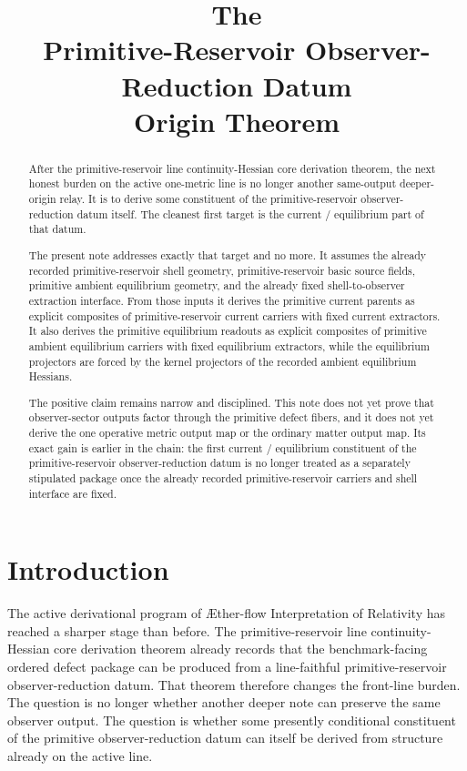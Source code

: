 \documentclass[11pt]{article}
\title{\textbf{The \TheoryName{}}\\[0.4em]
\large Primitive-Reservoir Observer-Reduction Datum\\
\large Origin Theorem}
\author{}
\date{}
\newcommand{\Aflow}{\AE{}ther-flow}
\newcommand{\TheoryName}{\Aflow{} Interpretation of Relativity}
\begin{document}
\maketitle

\begin{abstract}
After the primitive-reservoir line continuity-Hessian core derivation theorem, the next honest burden on the active one-metric line is no longer another same-output deeper-origin relay. It is to derive some constituent of the primitive-reservoir observer-reduction datum itself. The cleanest first target is the current / equilibrium part of that datum.

The present note addresses exactly that target and no more. It assumes the already recorded primitive-reservoir shell geometry, primitive-reservoir basic source fields, primitive ambient equilibrium geometry, and the already fixed shell-to-observer extraction interface. From those inputs it derives the primitive current parents as explicit composites of primitive-reservoir current carriers with fixed current extractors. It also derives the primitive equilibrium readouts as explicit composites of primitive ambient equilibrium carriers with fixed equilibrium extractors, while the equilibrium projectors are forced by the kernel projectors of the recorded ambient equilibrium Hessians.

The positive claim remains narrow and disciplined. This note does not yet prove that observer-sector outputs factor through the primitive defect fibers, and it does not yet derive the one operative metric output map or the ordinary matter output map. Its exact gain is earlier in the chain: the first current / equilibrium constituent of the primitive-reservoir observer-reduction datum is no longer treated as a separately stipulated package once the already recorded primitive-reservoir carriers and shell interface are fixed.
\end{abstract}

\section{Introduction}

The active derivational program of \TheoryName{} has reached a sharper stage than before. The primitive-reservoir line continuity-Hessian core derivation theorem already records that the benchmark-facing ordered defect package can be produced from a line-faithful primitive-reservoir observer-reduction datum. That theorem therefore changes the front-line burden. The question is no longer whether another deeper note can preserve the same observer output. The question is whether some presently conditional constituent of the primitive observer-reduction datum can itself be derived from structure already on the active line.
\end{document}
